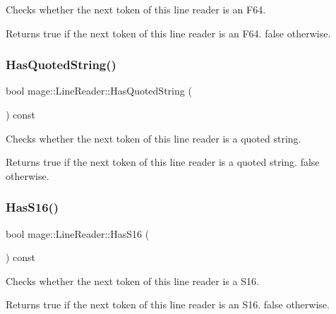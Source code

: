 Checks whether the next token of this line reader is an {\ttfamily F64}.

\begin{DoxyReturn}{Returns}
{\ttfamily true} if the next token of this line reader is an {\ttfamily F64}. {\ttfamily false} otherwise. 
\end{DoxyReturn}
\hypertarget{classmage_1_1_line_reader_ac92de9a3d986c7031c902c9489cfaa5a}{}\label{classmage_1_1_line_reader_ac92de9a3d986c7031c902c9489cfaa5a} 
\subsubsection{\texorpdfstring{Has\+Quoted\+String()}{HasQuotedString()}}
{\footnotesize\ttfamily bool mage\+::\+Line\+Reader\+::\+Has\+Quoted\+String (\begin{DoxyParamCaption}{ }\end{DoxyParamCaption}) const\hspace{0.3cm}{\ttfamily [protected]}}

Checks whether the next token of this line reader is a quoted string.

\begin{DoxyReturn}{Returns}
{\ttfamily true} if the next token of this line reader is a quoted string. {\ttfamily false} otherwise. 
\end{DoxyReturn}
\hypertarget{classmage_1_1_line_reader_af95711df4713d54f590c230e609b98aa}{}\label{classmage_1_1_line_reader_af95711df4713d54f590c230e609b98aa} 
\subsubsection{\texorpdfstring{Has\+S16()}{HasS16()}}
{\footnotesize\ttfamily bool mage\+::\+Line\+Reader\+::\+Has\+S16 (\begin{DoxyParamCaption}{ }\end{DoxyParamCaption}) const\hspace{0.3cm}{\ttfamily [protected]}}

Checks whether the next token of this line reader is a {\ttfamily S16}.

\begin{DoxyReturn}{Returns}
{\ttfamily true} if the next token of this line reader is an {\ttfamily S16}. {\ttfamily false} otherwise. 
\end{DoxyReturn}
\hypertarget{classmage_1_1_line_reader_ae27570a3d50f3e68f71c334016362e7e}{}\label{classmage_1_1_line_reader_ae27570a3d50f3e68f71c334016362e7e} 
